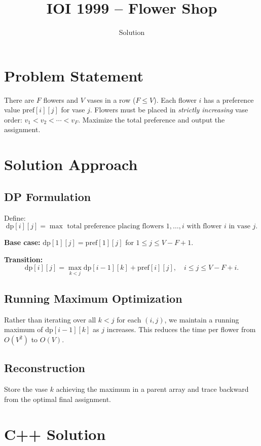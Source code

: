\documentclass[11pt,a4paper]{article}
\title{IOI 1999 -- Flower Shop}
\author{Solution}
\date{}
\begin{document}
\maketitle

\section{Problem Statement}

There are $F$ flowers and $V$ vases in a row ($F \le V$).
Each flower $i$ has a preference value $\mathrm{pref}[i][j]$ for vase $j$.
Flowers must be placed in \emph{strictly increasing} vase order:
$v_1 < v_2 < \cdots < v_F$.
Maximize the total preference and output the assignment.

\section{Solution Approach}

\subsection{DP Formulation}

Define:
\[
  \mathrm{dp}[i][j] = \max \text{ total preference placing flowers } 1, \ldots, i
                       \text{ with flower } i \text{ in vase } j.
\]

\textbf{Base case:} $\mathrm{dp}[1][j] = \mathrm{pref}[1][j]$ for
$1 \le j \le V - F + 1$.

\textbf{Transition:}
\[
  \mathrm{dp}[i][j] = \max_{k < j} \mathrm{dp}[i{-}1][k] + \mathrm{pref}[i][j],
  \quad i \le j \le V - F + i.
\]

\subsection{Running Maximum Optimization}

Rather than iterating over all $k < j$ for each $(i, j)$, we maintain a running maximum
of $\mathrm{dp}[i{-}1][k]$ as $j$ increases. This reduces the time per flower from
$O(V^2)$ to $O(V)$.

\subsection{Reconstruction}

Store the vase $k$ achieving the maximum in a parent array and trace backward from
the optimal final assignment.

\section{C++ Solution}
\end{document}
